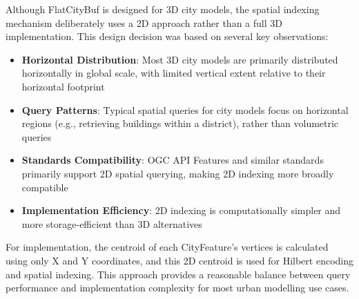 Although FlatCityBuf is designed for 3D city models, the spatial indexing mechanism deliberately uses a 2D approach rather than a full 3D implementation. This design decision was based on several key observations:

\begin{itemize}
    \item \textbf{Horizontal Distribution}: Most 3D city models are primarily distributed horizontally in global scale, with limited vertical extent relative to their horizontal footprint
    \item \textbf{Query Patterns}: Typical spatial queries for city models focus on horizontal regions (e.g., retrieving buildings within a district), rather than volumetric queries
    \item \textbf{Standards Compatibility}: OGC API Features and similar standards primarily support 2D spatial querying, making 2D indexing more broadly compatible 
    \item \textbf{Implementation Efficiency}: 2D indexing is computationally simpler and more storage-efficient than 3D alternatives
\end{itemize}

For implementation, the centroid of each CityFeature's vertices is calculated using only X and Y coordinates, and this 2D centroid is used for Hilbert encoding and spatial indexing. This approach provides a reasonable balance between query performance and implementation complexity for most urban modelling use cases.




